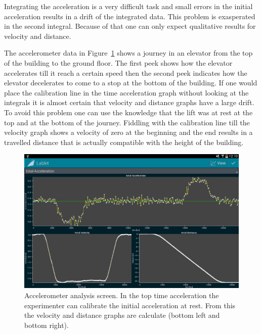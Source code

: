 \documentclass{sigchi}
\begin{document}
Integrating the acceleration is a very difficult task and small errors
in the initial acceleration results in a drift of the integrated data.
This problem is exasperated in the second integral.  Because of that
one can only expect qualitative results for velocity and distance.

The accelerometer data in Figure~\ref{fig:AccelerometerAnalysis} shows
a journey in an elevator from the top of the building to the ground
floor.  The first peek shows how the elevator accelerates till it
reach a certain speed then the second peek indicates how the elevator
decelerates to come to a stop at the bottom of the building.  If one
would place the calibration line in the time acceleration graph
without looking at the integrals it is almost certain that velocity
and distance graphs have a large drift.  To avoid this problem one can
use the knowledge that the lift was at rest at the top and at the
bottom of the journey.  Fiddling with the calibration line till the
velocity graph shows a velocity of zero at the beginning and the end
results in a travelled distance that is actually compatible with the
height of the building.

\begin{figure}
  \centering
  \includegraphics[width=.99\columnwidth]{AccelerometerAnalysis}
  \caption{Accelerometer analysis screen.  In the top time
    acceleration the experimenter can calibrate the initial
    acceleration at rest.  From this the velocity and distance graphs
    are calculate (bottom left and bottom
    right).\label{fig:AccelerometerAnalysis} }
\end{figure}
\end{document}
